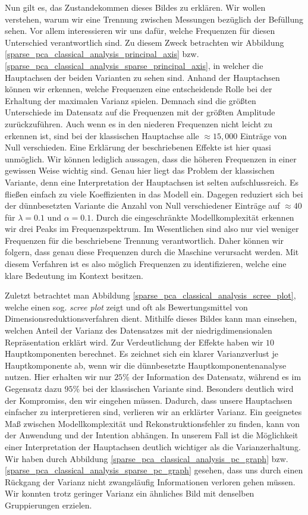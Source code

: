 Nun gilt es, das Zustandekommen dieses Bildes zu erklären. Wir wollen verstehen, warum wir eine Trennung zwischen Messungen bezüglich der Befüllung sehen. Vor allem interessieren wir uns dafür, welche Frequenzen für diesen Unterschied verantwortlich sind. Zu diesem Zweck betrachten wir Abbildung \ref{sparse_pca_classical_analysis_principal_axis} bzw. \ref{sparse_pca_classical_analysis_sparse_principal_axis}, in welcher die Hauptachsen der beiden Varianten zu sehen sind. Anhand der Hauptachsen können wir erkennen, welche Frequenzen eine entscheidende Rolle bei der Erhaltung der maximalen Varianz spielen. Demnach sind die größten Unterschiede im Datensatz auf die Frequenzen mit der größten Amplitude zurückzuführen. Auch wenn es in den niederen Frequenzen nicht leicht zu erkennen ist, sind bei der klassischen Hauptachse alle $\approx 15,000$ Einträge von Null verschieden. Eine Erklärung der beschriebenen Effekte ist hier quasi unmöglich. Wir können lediglich aussagen, dass die höheren Frequenzen in einer gewissen Weise wichtig sind. Genau hier liegt das Problem der klassischen Variante, denn eine Interpretation der Hauptachsen ist selten aufschlussreich. Es fließen einfach zu viele Koeffizienten in das Modell ein. Dagegen reduziert sich bei der dünnbesetzten Variante die Anzahl von Null verschiedener Einträge auf $\approx 40$ für $\lambda = 0.1$ und $\alpha = 0.1$. Durch die eingeschränkte Modellkomplexität erkennen wir drei Peaks im Frequenzspektrum. Im Wesentlichen sind also nur viel weniger Frequenzen für die beschriebene Trennung verantwortlich. Daher können wir folgern, dass genau diese Frequenzen durch die Maschine verursacht werden. Mit diesem Verfahren ist es also möglich Frequenzen zu identifizieren, welche eine klare Bedeutung im Kontext besitzen.

Zuletzt betrachtet man Abbildung \ref{sparse_pca_classical_analysis_scree_plot}, welche einen sog. \textit{scree plot} zeigt und oft als Bewertungsmittel von Dimensionsreduktionsverfahren dient. Mithilfe dieses Bildes kann man einsehen, welchen Anteil der Varianz des Datensatzes mit der niedrigdimensionalen Repräsentation erklärt wird. Zur Verdeutlichung der Effekte haben wir $10$ Hauptkomponenten berechnet. Es zeichnet sich ein klarer Varianzverlust je Hauptkomponente ab, wenn wir die dünnbesetzte Hauptkomponentenanalyse nutzen. Hier erhalten wir nur $25$\% der Information des Datensatz, während es im Gegensatz dazu $95$\% bei der klassischen Variante sind. Besonders deutlich wird der Kompromiss, den wir eingehen müssen. Dadurch, dass unsere Hauptachsen einfacher zu interpretieren sind, verlieren wir an erklärter Varianz. Ein geeignetes Maß zwischen Modellkomplexität und Rekonstruktionsfehler zu finden, kann von der Anwendung und der Intention abhängen. In unserem Fall ist die Möglichkeit einer Interpretation der Hauptachsen deutlich wichtiger als die Varianzerhaltung. Wir haben durch Abbildung \ref{sparse_pca_classical_analysis_pc_graph} bzw. \ref{sparse_pca_classical_analysis_sparse_pc_graph} gesehen, dass uns durch einen Rückgang der Varianz nicht zwangsläufig Informationen verloren gehen müssen. Wir konnten trotz geringer Varianz ein ähnliches Bild mit denselben Gruppierungen erzielen.

